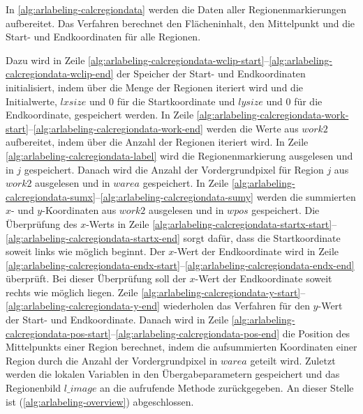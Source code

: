 In \autoref{alg:arlabeling-calcregiondata} werden die Daten aller Regionenmarkierungen aufbereitet. Das Verfahren
 berechnet den Flächeninhalt, den Mittelpunkt und die Start- und Endkoordinaten für alle Regionen.

Dazu wird in Zeile \ref{alg:arlabeling-calcregiondata-wclip-start}--\ref{alg:arlabeling-calcregiondata-wclip-end} der
 Speicher der Start- und Endkoordinaten initialisiert, indem über die Menge der Regionen iteriert wird und die
 Initialwerte, $\mathit{lxsize}$ und $0$ für die Startkoordinate und $\mathit{lysize}$ und $0$ für die Endkoordinate,
 gespeichert werden. In Zeile
 \ref{alg:arlabeling-calcregiondata-work-start}--\ref{alg:arlabeling-calcregiondata-work-end} werden die Werte aus
 $\mathit{work2}$ aufbereitet, indem über die Anzahl der Regionen iteriert wird. In Zeile
 \ref{alg:arlabeling-calcregiondata-label} wird die Regionenmarkierung ausgelesen und in $j$ gespeichert. Danach wird
 die Anzahl der Vordergrundpixel für Region $j$ aus $\mathit{work2}$ ausgelesen und in $\mathit{warea}$ gespeichert. In
 Zeile \ref{alg:arlabeling-calcregiondata-sumx}--\ref{alg:arlabeling-calcregiondata-sumy} werden die summierten $x$- und
 $y$-Koordinaten aus $\mathit{work2}$ ausgelesen und in $\mathit{wpos}$ gespeichert. Die Überprüfung des $x$-Werts in
 Zeile \ref{alg:arlabeling-calcregiondata-startx-start}--\ref{alg:arlabeling-calcregiondata-startx-end} sorgt dafür,
 dass die Startkoordinate soweit links wie möglich beginnt. Der $x$-Wert der Endkoordinate wird in Zeile
 \ref{alg:arlabeling-calcregiondata-endx-start}--\ref{alg:arlabeling-calcregiondata-endx-end} überprüft. Bei dieser
 Überprüfung soll der $x$-Wert der Endkoordinate soweit rechts wie möglich liegen. Zeile
 \ref{alg:arlabeling-calcregiondata-y-start}--\ref{alg:arlabeling-calcregiondata-y-end} wiederholen das Verfahren für
 den $y$-Wert der Start- und Endkoordinate. Danach wird in Zeile
 \ref{alg:arlabeling-calcregiondata-pos-start}--\ref{alg:arlabeling-calcregiondata-pos-end} die Position des
 Mittelpunkts einer Region berechnet, indem die aufsummierten Koordinaten einer Region durch die Anzahl der
  Vordergrundpixel in $\mathit{warea}$ geteilt wird. Zuletzt werden die lokalen Variablen in den Übergabeparametern
 gespeichert und das Regionenbild $\mathit{l\_image}$ an die aufrufende Methode zurückgegeben. An dieser Stelle ist
  (\autoref{alg:arlabeling-overview}) abgeschlossen.

